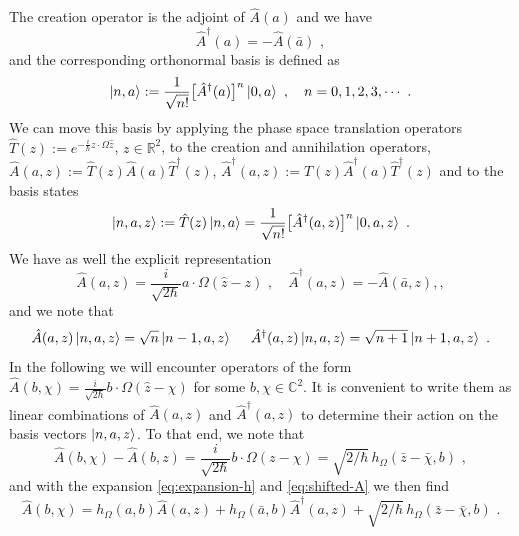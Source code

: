 \documentclass[12pt]{iopart} %
\begin{document}
The creation operator is the adjoint of $\hat A(a)$ and we have 
\begin{equation} \label{eq:ADagHag}
\hat A^{\dagger}(a)=-\hat A(\bar{a})\,\, ,
\end{equation}
and the corresponding orthonormal basis is defined  as 
\begin{equation}
\ket{n,a}:=\frac{1}{\sqrt{n!}}\big[\hat A^{\dagger}(a)\big]^n\ket{ 0,a}\,\, , \quad n=0,1,2,3,\cdots \,\, .
\end{equation}
We can move this basis by applying  the phase space translation operators $\hat T(z):=e^{-\frac{i}{\hbar} z\cdot \Omega \hat z}$, $z\in \mathbb{R}^2$, to the  creation and annihilation operators, $\hat A(a,z):=\hat T(z)\hat A(a)\hat T^{\dagger}(z)$, $\hat A^{\dagger}(a,z):=\hat T(z)\hat A^{\dagger}(a)\hat T^{\dagger}(z)$ and to the basis states
\begin{equation}\label{def:basis-shifted}
\ket{n,a,z}:=\hat T(z)\ket{n,a}=\frac{1}{\sqrt{n!}}\big[\hat A^{\dagger}(a,z)\big]^n\ket{ 0,a,z}\,\, .
\end{equation}
We have as well the explicit representation 
\begin{equation}\label{eq:shifted-A}
\hat A(a,z)=\frac{i}{\sqrt{2\hbar}} a\cdot \Omega (\hat z-z) \,\, , \quad \hat A^{\dagger}(a,z)=-\hat A(\bar{a},z),
,\end{equation}
and we note that 
\begin{equation}\label{eq:actA}
\hat A(a,z)\ket{n,a,z}=\sqrt{n}\ket{n-1,a,z}\,\, \quad \hat A^{\dagger}(a,z)\ket{n,a,z}=\sqrt{n+1}\ket{n+1,a,z}\,\, .
\end{equation}
In the following we will encounter operators of the form $\hat A(b,\chi)=\frac{i}{\sqrt{2\hbar}} b\cdot \Omega (\hat z-\chi)$ for some $b, \chi\in \mathbb{C}^2$. It is convenient to write them as linear combinations of $\hat A(a,z)$ and $\hat A^{\dagger}(a,z)$ to determine their action on the basis vectors  $\ket{n,a,z}$. To that end, we note that
\begin{equation}
\hat A(b,\chi)-\hat A(b,z)=\frac{i}{\sqrt{2\hbar}} b\cdot \Omega (z-\chi)=\sqrt{2/\hbar} \, h_{\Omega}( \bar z-\bar \chi, b)\,\, , 
\end{equation}
and with the expansion \eqref{eq:expansion-h} and \eqref{eq:shifted-A} we then find
\begin{equation}\label{eq:expansion-A}
\hat A(b,\chi)=h_{\Omega}(a,b) \hat A(a,z)+h_{\Omega}( \bar{a},b)\hat A^{\dagger}(a,z)+\sqrt{2/\hbar} \, h_{\Omega}( \bar z- \bar \chi, b)\,\, .
\end{equation}
\end{document}
